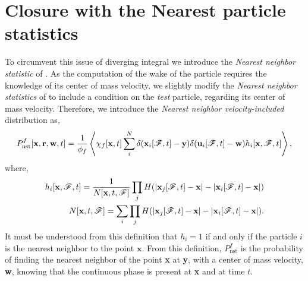 \section{Closure with the Nearest particle statistics}

To circumvent this issue of diverging integral we introduce the \textit{Nearest neighbor statistic} of \citet{zhang2021ensemble}. 
As the computation of the wake of the particle requires the knowledge of its center of mass velocity, we slightly modify the \textit{Nearest neighbor statistics} of \citet{zhang2021ensemble} to include a condition on the \textit{test} particle, regarding its center of mass velocity.
Therefore,  we introduce the \textit{Nearest neighbor velocity-included} distribution as, 
\begin{equation}
    P_\text{nst}^f[\textbf{x},\textbf{r},\textbf{w},t]
    = \frac{1}{\phi_f}\left<
        \chi_f[\textbf{x},t]
        \sum_i^N 
        \delta(\textbf{x}_i[\mathscr{F},t]-\textbf{y})
        \delta(\textbf{u}_i[\mathscr{F},t]-\textbf{w})
        h_i[\textbf{x},\mathscr{F},t]
    \right>,
\end{equation}
where,
\begin{align}
    \label{eq:h_i_def}
    h_i[\textbf{x},\FF,t]
    = \frac{1}{N[\textbf{x},t,\FF]}
    \prod_j H(|\textbf{x}_j[\FF,t] - \textbf{x}| - |\textbf{x}_i[\FF,t] - \textbf{x}|)\\
    \label{eq:N_def}
    N[\textbf{x},t,\FF]
    = \sum_i\prod_jH(|\textbf{x}_j[\FF,t] - \textbf{x}| - |\textbf{x}_i[\FF,t] - \textbf{x}|).
\end{align}
It must be understood from this definition that $h_i=1$ if and only if the particle $i$ is the nearest neighbor to the point $\textbf{x}$. 
From this definition, $P_\text{nst}^f$ is the probability of finding the nearest neighbor of the point \textbf{x} at \textbf{y}, with a center of mass velocity, \textbf{w}, knowing that the continuous phase is present at \textbf{x} and at time $t$. 

